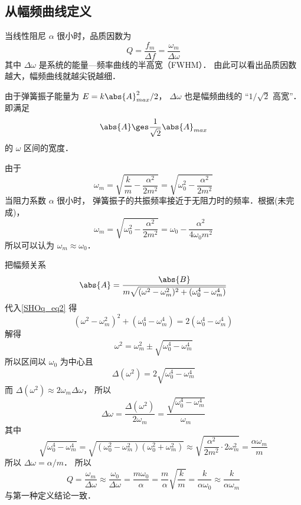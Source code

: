 \subsection{从幅频曲线定义}
当线性阻尼 $\alpha$ 很小时，品质因数为
\begin{equation}
Q = \frac{f_m}{\Delta {f}} = \frac{\omega_m}{\Delta \omega}
\end{equation}
其中 $\Delta\omega$ 是系统的能量—频率曲线的半高宽（FWHM）．%
由此可以看出品质因数越大，幅频曲线就越尖锐越细．

由于弹簧振子能量为 $E = k\abs{A}_{max}^2/2$， $\Delta \omega$ 也是幅频曲线的 “$1/\sqrt{2}$ 高宽”． 即满足
\begin{equation}\label{SHOq_eq2}
\abs{A} \ges \frac{1}{\sqrt{2}} \abs{A}_{max}
\end{equation}
的 $\omega$ 区间的宽度．

由于
\begin{equation}
\omega_m = \sqrt{\frac{k}{m} - \frac{\alpha^2}{2m^2}} = \sqrt{\omega_0^2 - \frac{\alpha^2}{2m^2}}
\end{equation}
当阻力系数 $\alpha$ 很小时， 弹簧振子的共振频率接近于无阻力时的频率．根据(未完成)，
\begin{equation}
\omega_m = \sqrt{\omega_0^2 - \frac{\alpha^2}{2m^2}} = \omega_0 - \frac{\alpha^2}{4\omega_0 m^2}
\end{equation}
所以可以认为 $\omega_m \approx \omega_0$．

把幅频关系
\begin{equation}
\abs{A} = \frac{\abs{B}}{m\sqrt{(\omega^2 - \omega_m^2)^2 + (\omega_0^4 - \omega_m^4)}}
\end{equation}
代入\autoref{SHOq_eq2} 得
\begin{equation}
(\omega^2 - \omega_m^2)^2 + (\omega_0^4 - \omega_m^4) = 2(\omega_0^4 - \omega_m^4)
\end{equation}
解得
\begin{equation}
\omega^2 = \omega_m^2 \pm \sqrt{\omega_0^4 - \omega_m^4}
\end{equation}
所以区间以 $\omega_0$ 为中心且
\begin{equation}
\Delta(\omega^2) = 2\sqrt{\omega_0^4 - \omega_m^4}
\end{equation}
而 $\Delta(\omega^2) \approx 2\omega_m \Delta \omega$， 所以
\begin{equation}
\Delta \omega =  \frac{\Delta(\omega^2)}{2\omega_m} = \frac{\sqrt{\omega_0^4 - \omega_m^4}}{\omega_m}
\end{equation}
其中
\begin{equation}
\sqrt{\omega_0^4 - \omega_m^4} = \sqrt{(\omega_0^2 - \omega_m^2)(\omega_0^2 + \omega_m^2)}
\approx \sqrt{\frac{\alpha^2}{2m^2} \cdot 2\omega_m^2} = \frac{\alpha\omega_m}{m}
\end{equation}
所以 $\Delta \omega = {\alpha}/{m}$． 所以
\begin{equation}
Q = \frac{\omega_m}{\Delta \omega} \approx \frac{\omega_0}{\Delta \omega} = \frac{m\omega_0}{\alpha} = \frac{m}{\alpha} \sqrt{\frac{k}{m}} = \frac{k}{\alpha \omega_0}
\approx \frac{k}{\alpha\omega_m}
\end{equation}
与第一种定义结论一致．
